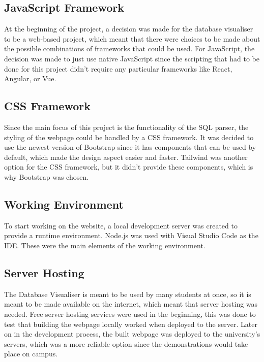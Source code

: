\subsection{JavaScript Framework}

At the beginning of the project, a decision was made for the database visualiser to be a web-based project, which meant that there were choices to be made about the possible combinations of frameworks that could be used. For JavaScript, the decision was made to just use native JavaScript since the scripting that had to be done for this project didn't require any particular frameworks like React, Angular, or Vue.

\subsection{CSS Framework}

Since the main focus of this project is the functionality of the SQL parser, the styling of the webpage could be handled by a CSS framework. It was decided to use the newest version of Bootstrap \cite{Bootstrap} since it has components that can be used by default, which made the design aspect easier and faster. Tailwind was another option for the CSS framework, but it didn't provide these components, which is why Bootstrap was chosen.

\subsection{Working Environment}

To start working on the website, a local development server was created to provide a runtime environment. Node.js was used with Visual Studio Code \cite{Code} as the IDE. These were the main elements of the working environment.

\subsection{Server Hosting}

The Database Visualiser is meant to be used by many students at once, so it is meant to be made available on the internet, which meant that server hosting was needed. Free server hosting services\cite{Infinity} were used in the beginning, this was done to test that building the webpage locally worked when deployed to the server. Later on in the development process, the built webpage was deployed to the university's servers, which was a more reliable option since the demonstrations would take place on campus.

